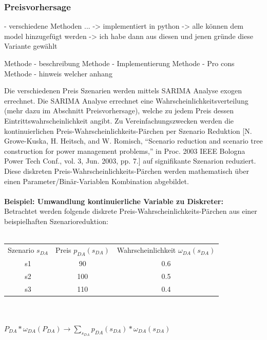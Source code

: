 \subsubsection{Preisvorhersage}

- verschiedene Methoden ...
-> implementiert in python
-> alle können dem model hinzugefügt werden
-> ich habe dann aus diesen und jenen gründe diese Variante gewählt

Methode - beschreibung
Methode - Implementierung
Methode - Pro cons
Methode - hinweis welcher anhang





Die verschiedenen Preis Szenarien werden mittels SARIMA Analyse exogen errechnet. Die SARIMA Analyse errechnet eine Wahrscheinlichkeitsverteilung (mehr dazu im Abschnitt Preisvorhersage), welche zu jedem Preis dessen Eintrittswahrscheinlichkeit angibt. Zu Vereinfachungszwecken werden die kontinuierlichen Preis-Wahrscheinlichkeits-Pärchen per Szenario Reduktion [N. Growe-Kuska, H. Heitsch, and W. Romisch, “Scenario reduction and scenario tree construction for power management problems,” in Proc.
		2003 IEEE Bologna Power Tech Conf., vol. 3, Jun. 2003, pp. 7.] auf signifikante Szenarion reduziert.
Diese diskreten Preis-Wahrscheinlichkeits-Pärchen werden mathematisch über einen Parameter/Binär-Variablen Kombination abgebildet.\\
\\
\textbf{Beispiel: Umwandlung kontinuierliche Variable zu Diskreter:}
\\
Betrachtet werden folgende diskrete Preis-Wahrscheinlichkeits-Pärchen aus einer beispielhaften Szenarioreduktion:\\
\\
\begin{tabular}{c|c|c}
	Szenario $s_{DA}$ & Preis $p_{DA}(s_{DA})$ & Wahrscheinlichkeit $\omega_{DA}(s_{DA})$ \\
	s1                & 90                     & 0.6                                      \\
	s2                & 100                    & 0.5                                      \\
	s3                & 110                    & 0.4                                      \\
\end{tabular}\\
\\

$P_{DA} * \omega_{DA}(P_{DA}) \rightarrow \sum_{s_{DA}} p_{DA}(s_{DA}) * \omega_{DA}(s_{DA})$\\

